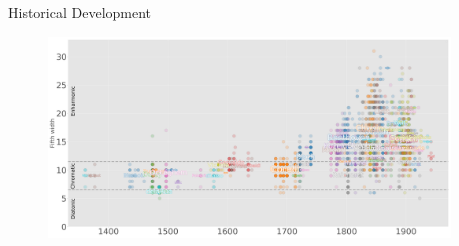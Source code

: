 \documentclass[final]{beamer}
\begin{document}
\begin{frame}[t]
\begin{minipage}[t][.65\textheight][t]{\textwidth}
\begin{columns}[t]
\begin{column}{0.3\textwidth}
    \end{column}
  \end{columns}

\end{minipage}

\begin{minipage}[t][.3\textheight][t]{\textwidth}

	\begin{columns}
		\begin{column}{.6\textwidth}
		  \begin{block}{Historical Development}

		    \begin{figure}[H]
		      \centering
					\includegraphics[width=\textwidth]{img/fifth_widths}
		    \end{figure}

		  \end{block}
		\end{column}

		\begin{column}{.3\textwidth}

		\end{column}

\end{columns}
\end{minipage}

\end{frame} %
\end{document}
